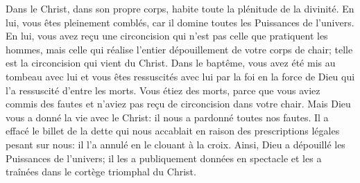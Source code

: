 Dans le Christ, dans son propre corps, habite toute la plénitude de la divinité. 
En lui, vous êtes pleinement comblés, car il domine toutes les Puissances de l’univers.
En lui, vous avez reçu une circoncision qui n’est pas celle que pratiquent les hommes,
	mais celle qui réalise l’entier dépouillement de votre corps de chair;
	telle est la circoncision qui vient du Christ.
Dans le baptême, vous avez été mis au tombeau avec lui et vous êtes ressuscités avec lui
	par la foi en la force de Dieu qui l’a ressuscité d’entre les morts.
Vous étiez des morts, parce que vous aviez commis des fautes
	et n’aviez pas reçu de circoncision dans votre chair.
Mais Dieu vous a donné la vie avec le Christ:
	il nous a pardonné toutes nos fautes.
Il a effacé le billet de la dette qui nous accablait
		en raison des prescriptions légales pesant sur nous:
	il l’a annulé en le clouant à la croix.
Ainsi, Dieu a dépouillé les Puissances de l’univers;
	il les a publiquement données en spectacle
		et les a traînées dans le cortège triomphal du Christ.
